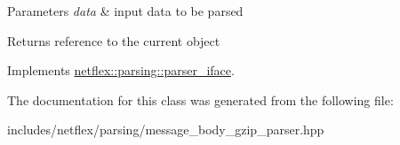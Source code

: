 \begin{DoxyParams}{Parameters}
{\em data} & input data to be parsed \\
\hline
\end{DoxyParams}
\begin{DoxyReturn}{Returns}
reference to the current object 
\end{DoxyReturn}


Implements \hyperlink{classnetflex_1_1parsing_1_1parser__iface_a6b092567e70a5c0bf7568e94d06f7154}{netflex\+::parsing\+::parser\+\_\+iface}.



The documentation for this class was generated from the following file\+:\begin{DoxyCompactItemize}
\item 
includes/netflex/parsing/message\+\_\+body\+\_\+gzip\+\_\+parser.\+hpp\end{DoxyCompactItemize}
